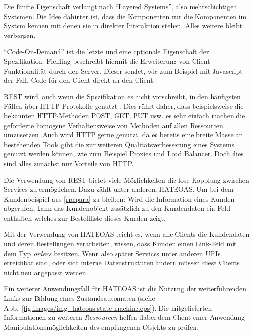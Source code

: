 \documentclass[12pt,a4paper,bibliography=totocnumbered,listof=totocnumbered]{scrartcl}
\begin{document}
Die fünfte Eigenschaft verlangt nach \enquote{Layered Systems}, also mehrschichtigen Systemen. Die Idee dahinter ist, dass die Komponenten nur die Komponenten im System kennen mit denen sie in direkter Interaktion stehen. Alles weitere bleibt verborgen.

\enquote{Code-On-Demand} ist die letzte und eine optionale Eigenschaft der Spezifikation. Fielding beschreibt hiermit die Erweiterung von Client-Funktionalität durch den Server. Dieser sendet, wie zum Beispiel mit Javascript der Fall, Code für den Client direkt an den Client.\cite{fielding}

REST wird, auch wenn die Spezifikation es nicht vorschreibt, in den häufigsten Fällen über HTTP-Protokolle genutzt \cite[S.97]{buildingms}. Dies rührt daher, dass beispielsweise die bekannten HTTP-Methoden POST, GET, PUT usw. es sehr einfach machen die geforderte homogene Verhaltensweise von Methoden auf allen Ressourcen umzusetzen. Auch wird HTTP gerne genutzt, da es bereits eine breite Masse an bestehenden Tools gibt die zur weiteren Qualitätsverbesserung eines Systems genutzt werden können, wie zum Beispiel Proxies und Load Balancer. Doch dies sind alles zunächst nur Vorteile von HTTP.

Die Verwendung von REST bietet viele Möglichkeiten die lose Kopplung zwischen Services zu ermöglichen. Dazu zählt unter anderem \ac{HATEOAS}. Um bei dem Kundenbeispiel aus \ref{rpcpara} zu bleiben: Wird die Information eines Kunden abgerufen, kann das Kundenobjekt zusätzlich zu den Kundendaten ein Feld enthalten welches zur Bestellliste dieses Kunden zeigt.



Mit der Verwendung von \ac{HATEOAS} reicht es, wenn alle Clients die Kundendaten und deren Bestellungen verarbeiten, wissen, dass Kunden einen Link-Feld mit dem Typ \textit{orders} besitzen. Wenn also später Services unter anderen \acsp{URI} erreichbar sind, oder sich interne Datenstrukturen ändern müssen diese Clients nicht neu angepasst werden.

Ein weiterer Anwendungsfall für \ac{HATEOAS} ist die Nutzung der weiterführenden Links zur Bildung eines Zustandsautomaten (siehe Abb.~\ref{fig:images/img_hateoas-state-machine.eps}). Die mitgelieferten Informationen zu weiteren \textit{Ressourcen} helfen dabei dem Client einer Anwendung Manipulationsmöglichkeiten des empfangenen Objekts zu prüfen.

\end{document}
